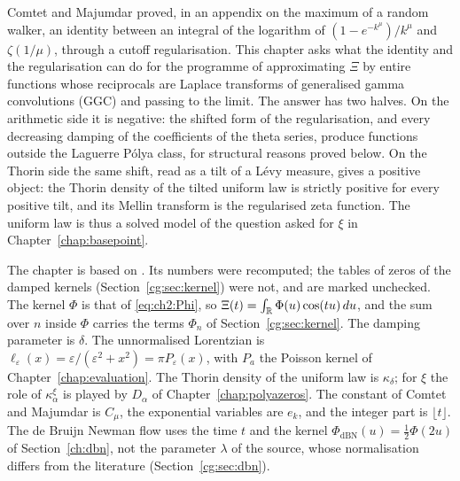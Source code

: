 \label{chap:cg}

\providecommand{\CGLi}{\operatorname{Li}}
\providecommand{\CGLP}{\mathcal{L}\mathcal{P}}

Comtet and Majumdar \cite{ComtetMajumdar05} proved, in an appendix on the maximum of a random walker, an identity between an integral of the logarithm of $(1-e^{-k^\mu})/k^\mu$ and $\zeta(1/\mu)$, through a cutoff regularisation. This chapter asks what the identity and the regularisation can do for the programme of approximating $\Xi$ by entire functions whose reciprocals are Laplace transforms of generalised gamma convolutions (GGC) and passing to the limit. The answer has two halves. On the arithmetic side it is negative: the shifted form of the regularisation, and every decreasing damping of the coefficients of the theta series, produce functions outside the Laguerre P\'olya class, for structural reasons proved below. On the Thorin side the same shift, read as a tilt of a L\'evy measure, gives a positive object: the Thorin density of the tilted uniform law is strictly positive for every positive tilt, and its Mellin transform is the regularised zeta function. The uniform law is thus a solved model of the question asked for $\xi$ in Chapter~\ref{chap:basepoint}.

The chapter is based on \cite{P26cg}. Its numbers were recomputed; the tables of zeros of the damped kernels (Section~\ref{cg:sec:kernel}) were not, and are marked unchecked. The kernel $\Phi$ is that of \eqref{eq:ch2:Phi}, so $\Xi(t)=\int_{\mathbb{R}}\Phi(u)\cos(tu)\,du$, and the sum over $n$ inside $\Phi$ carries the terms $\Phi_n$ of Section~\ref{cg:sec:kernel}. The damping parameter is $\delta$. The unnormalised Lorentzian is $\ell_\varepsilon(x)=\varepsilon/(\varepsilon^2+x^2)=\pi P_\varepsilon(x)$, with $P_a$ the Poisson kernel of Chapter~\ref{chap:evaluation}. The Thorin density of the uniform law is $\kappa_\delta$; for $\xi$ the role of $\kappa^\xi_\alpha$ is played by $D_\alpha$ of Chapter~\ref{chap:polyazeros}. The constant of Comtet and Majumdar is $C_\mu$, the exponential variables are $e_k$, and the integer part is $\lfloor t\rfloor$. The de Bruijn Newman flow uses the time $t$ and the kernel $\Phi_{\mathrm{dBN}}(u)=\frac12\Phi(2u)$ of Section~\ref{ch:dbn}, not the parameter $\lambda$ of the source, whose normalisation differs from the literature (Section~\ref{cg:sec:dbn}).

